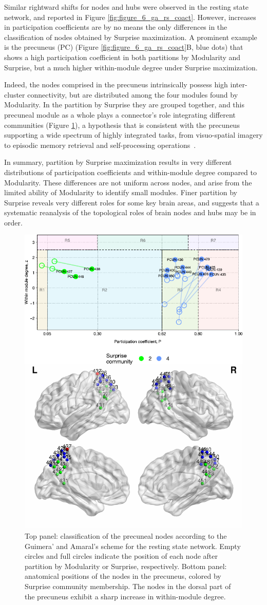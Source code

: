 Similar rightward shifts for nodes and hubs were observed in the resting state network, and reported in Figure \ref{fig:figure_6_ga_rs_coact}.
However, increases in participation coefficients are by no means the only differences in the classification of nodes obtained by Surprise maximization. A prominent example is the precuneus (PC) (Figure \ref{fig:figure_6_ga_rs_coact}B, blue dots) that shows a high participation coefficient in both partitions by Modularity and Surprise, but a much higher within-module degree under Surprise maximization.

Indeed, the nodes comprised in the precuneus intrinsically possess high inter-cluster connectivity, but are distributed among the four modules found by Modularity. In the partition by Surprise they are grouped together, and this precuneal module as a whole plays a connector's role integrating different communities (Figure \ref{fig:figure_8_ga_rs_precuneus}), a hypothesis that is consistent with the precuneus supporting a wide spectrum of highly integrated tasks, from visuo-spatial imagery to episodic memory retrieval and self-processing operations~\cite{cavanna2006}.

In summary, partition by Surprise maximization results in very different distributions of participation coefficients and within-module degree compared to Modularity. These differences are not uniform across nodes, and arise from the limited ability of Modularity to identify small modules. Finer partition by Surprise reveals very different roles for some key brain areas, and suggests that a systematic reanalysis of the topological roles of brain nodes and hubs may be in order.

\begin{figure}[htb!]
\centering
\includegraphics[width=0.5\linewidth]{images/figure_8_precuneus.pdf}
\caption{Top panel: classification of the precuneal nodes according to the Guimera' and Amaral's scheme for the resting state network. Empty circles and full circles indicate the position of each node after partition by Modularity or Surprise, respectively. Bottom panel: anatomical positions of the nodes in the precuneus, colored by Surprise community membership. The nodes in the dorsal part of the precuneus exhibit a sharp increase in within-module degree.}
\label{fig:figure_8_ga_rs_precuneus}
\end{figure}


